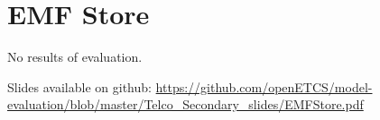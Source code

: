 \chapter{EMF Store}
\label{sec:emf store}


No results of evaluation.

Slides available on github: \url{https://github.com/openETCS/model-evaluation/blob/master/Telco_Secondary_slides/EMFStore.pdf }